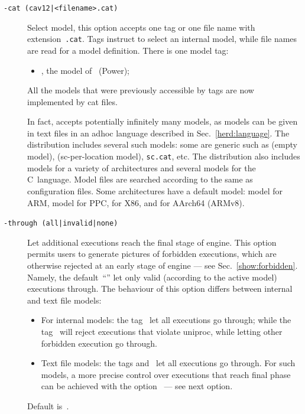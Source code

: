\begin{description}
\item[{\tt -cat (cav12|<filename>.cat)}]
Select model, this option accepts one tag or one file name
with extension~\texttt{.cat}.
Tags instruct \herd{} to select an internal model,
while file names are read for a model definition.
There is one model tag:
\begin{itemize}
\item {}, the model of~\cite{mms12} (Power);
\end{itemize}
All the models that were previously accessible by tags are now implemented by cat files. 

In fact, \herd{} accepts potentially infinitely many models,
as models can be given in text files in an adhoc language described in
Sec.~\ref{herd:language}.
The \herd{} distribution includes several such models:
some are generic such as
 (empty model), 
(sc-per-location model), \texttt{sc.cat}, etc.
The \herd{} distribution also includes models for a variety of architectures
and several models for the C~language.
Model files are searched according to  the same
as configuration files.
Some architectures have a default model:
 model for ARM,  model for PPC,
 for X86, and  for AArch64 (ARMv8).

\item[{\tt -through (all|invalid|none)}]
Let additional executions reach the final stage of \herd{} engine.
This option permits users to generate pictures of forbidden executions, which
are otherwise rejected at an early stage of \herd{} engine --- see Sec.~\ref{show:forbidden}.
Namely, the default~``'' let only valid (according to the
active model) executions through.
The behaviour of this option differs between internal and text file models:
\begin{itemize}
\item For internal models:
the tag~ let all executions go through;
while the tag~ will reject executions that violate uniproc,
while letting other forbidden execution go through.
\item Text file models: the tags  and~ let all
executions go through. For such models, a more precise control over
executions that reach \herd{} final phase can be achieved
with the option~ --- see  next option.
\end{itemize}
Default is~.


\end{description}
